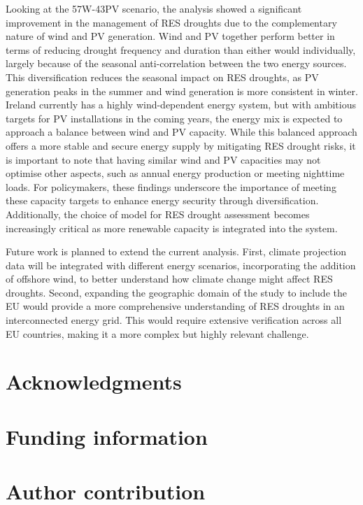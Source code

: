 \documentclass[a4paper, 11p1t]{article}
\begin{document}
Looking at the 57W-43PV scenario, the analysis showed a significant improvement in the management of RES droughts due to the complementary nature of wind and PV generation. Wind and PV together perform better in terms of reducing drought frequency and duration than either would individually, largely because of the seasonal anti-correlation between the two energy sources. This diversification reduces the seasonal impact on RES droughts, as PV generation peaks in the summer and wind generation is more consistent in winter. Ireland currently has a highly wind-dependent energy system, but with ambitious targets for PV installations in the coming years, the energy mix is expected to approach a balance between wind and PV capacity. While this balanced approach offers a more stable and secure energy supply by mitigating RES drought risks, it is important to note that having similar wind and PV capacities may not optimise other aspects, such as annual energy production or meeting nighttime loads. For policymakers, these findings underscore the importance of meeting these capacity targets to enhance energy security through diversification. Additionally, the choice of model for RES drought assessment becomes increasingly critical as more renewable capacity is integrated into the system.

Future work is planned to extend the current analysis. First, climate projection data will be integrated with different energy scenarios, incorporating the addition of offshore wind, to better understand how climate change might affect RES droughts. Second, expanding the geographic domain of the study to include the EU would provide a more comprehensive understanding of RES droughts in an interconnected energy grid. This would require extensive verification across all EU countries, making it a more complex but highly relevant challenge.

\newpage
\section{Acknowledgments}

\section{Funding information}

\section{Author contribution}


\end{document}
